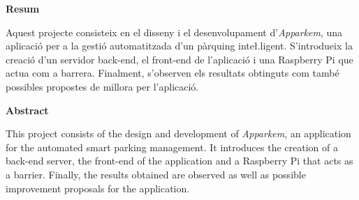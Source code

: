 {}
\centerline{\textbf{Resum}}
Aquest projecte consisteix en el disseny i el desenvolupament d'\emph{Apparkem},
una aplicació per a la gestió automatitzada d'un pàrquing inte\l.ligent.
S'introdueix la creació d'un servidor back-end, el front-end de l'aplicació
i una Raspberry Pi que actua com a barrera. Finalment, s'observen els resultats
obtinguts com també possibles propostes de millora per l'aplicació.
\vfill
{}
{}
\centerline{\textbf{Abstract}}
This project consists of the design and development of \emph{Apparkem}, an application
for the automated smart parking management. It introduces the creation
of a back-end server, the front-end of the application and a Raspberry Pi that
acts as a barrier. Finally, the results obtained are observed as well as possible
improvement proposals for the application.



